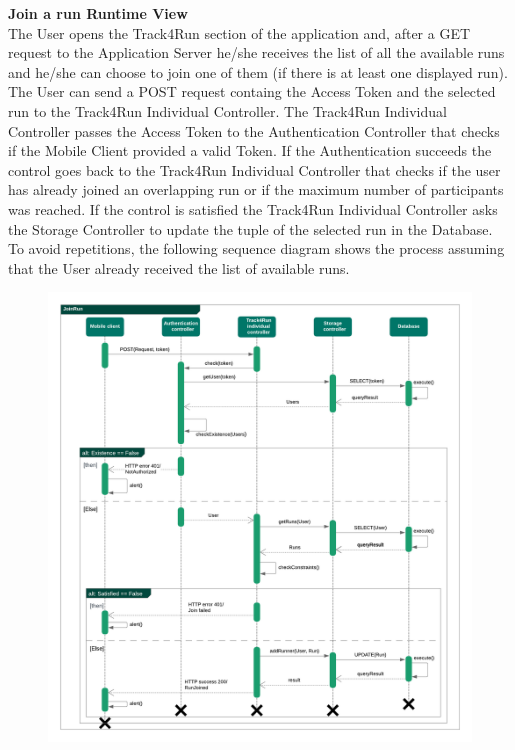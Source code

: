 \begin{legal}
\begin{legal}
				\newpage
				\item \textbf{Join a run Runtime View}\\
The User opens the Track4Run section of the application and, after a GET request to the Application Server he/she receives the list of all the available runs and he/she can choose to join one of them (if there is at least one displayed run).
The User can send a POST request containg the Access Token and the selected run to the Track4Run Individual Controller.
The Track4Run Individual Controller passes the Access Token to the Authentication Controller that checks if the Mobile Client provided a valid Token.
If the Authentication succeeds the control goes back to the Track4Run Individual Controller that checks if the user has already joined an overlapping run or if the maximum number of participants was reached.
If the control is satisfied the Track4Run Individual Controller asks the Storage Controller to update the tuple of the selected run in the Database.
To avoid repetitions, the following sequence diagram shows the process assuming that the User already received the list of available runs.
				\begin{figure}[H]
				\includegraphics[width=\linewidth]{images/seq_diagrams/joinRunSeq.png}\\
				\end{figure}
				

\end{legal}
\end{legal}
